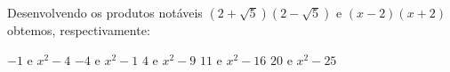 Desenvolvendo os produtos notáveis $(2+\sqrt{5})(2-\sqrt{5})$ e $(x-2)(x+2)$ obtemos, respectivamente:

$-1$ e $x^2-4$
$-4$ e $x^2-1$
$4$ e $x^2-9$
$11$ e $x^2-16$
$20$ e $x^2-25$


